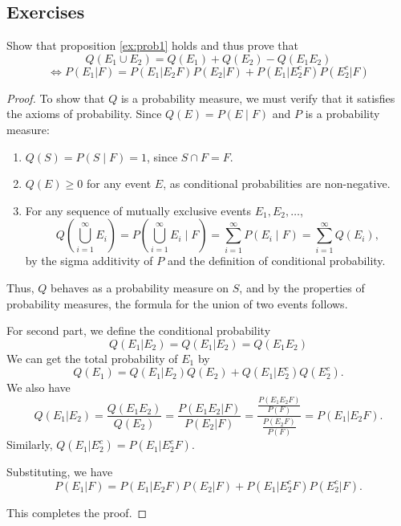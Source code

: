 \subsection{Exercises}
\begin{exercise}
	Show that proposition \ref{ex:prob1} holds and thus prove that 
	\[Q(E_1 \cup E_2)=Q(E_1) + Q(E_2) - Q(E_1E_2) \]
	\[\iff P(E_1|F)=P(E_1|E_2F)P(E_2|F) + P(E_1|E_2^cF)P(E_2^c|F)\]
\end{exercise}
\begin{proof}
	To show that \( Q \) is a probability measure, we must verify that it satisfies the axioms of probability. Since \( Q(E) = P(E \mid F) \) and \( P \) is a probability measure:
	\begin{enumerate}
		\item \( Q(S) = P(S \mid F) = 1 \), since \( S \cap F = F \).
		\item \( Q(E) \geq 0 \) for any event \( E \), as conditional probabilities are non-negative.
		\item For any sequence of mutually exclusive events \( E_1, E_2, \ldots \),
		\[
		Q\left(\bigcup_{i=1}^\infty E_i\right) = P\left(\bigcup_{i=1}^\infty E_i \mid F\right) = \sum_{i=1}^\infty P(E_i \mid F) = \sum_{i=1}^\infty Q(E_i),
		\]
		by the sigma additivity of \( P \) and the definition of conditional probability.
	\end{enumerate}
	Thus, \( Q \) behaves as a probability measure on \( S \), and by the properties of probability measures, the formula for the union of two events follows.
	
	For second part, we define the conditional probability 
	\[Q(E_1|E_2)=Q(E_1|E_2)=Q(E_1E_2)\]
	We can get the total probability of $E_1$ by
	\[Q(E_{1})=Q(E_{1}|E_{2})Q(E_{2}) + Q(E_{1}|E_{2}^{c})Q(E_{2}^{c}).\]
	We also have 
	\[
		Q(E_1|E_2) = \frac{Q(E_1E_2)}{Q(E_2)} =\frac{P(E_1E_2|F)}{P(E_2|F)}  =\frac{\frac{P(E_1E_2F)}{P(F)}}{\frac{P(E_2F)}{P(F)}} =P(E_1|E_2F).
	\]
	Similarly, $Q(E_1|E_2^c) = P(E_1|E_2^cF)$.
	
	Substituting, we have
	\[P(E_1|F)=P(E_1|E_2F)P(E_2|F) + P(E_1|E_2^cF)P(E_2^c|F).\]
	
	This completes the proof.
\end{proof}

